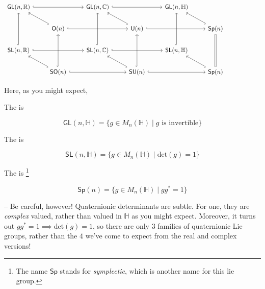 \documentclass[../main.tex]{subfiles}
\begin{document}
\[\begin{tikzcd}
	&&&&& {} \\
	{\mathsf{GL}(n,\mathbb{R})} && {\mathsf{GL}(n,\mathbb{C})} && {\mathsf{GL}(n,\mathbb{H})} \\
	& {\mathsf{O}(n)} && {\mathsf{U}(n)} && {\mathsf{Sp}(n)} && {} \\
	{\mathsf{SL}(n,\mathbb{R})} && {\mathsf{SL}(n,\mathbb{C})} && {\mathsf{SL}(n,\mathbb{H})} \\
	& {\mathsf{SO}(n)} && {\mathsf{SU}(n)} && {\mathsf{Sp}(n)}
	\arrow[hook, from=4-1, to=2-1]
	\arrow[hook, from=3-2, to=2-1]
	\arrow[hook, from=5-2, to=4-1]
	\arrow[hook, from=5-2, to=3-2]
	\arrow[hook, from=4-3, to=2-3]
	\arrow[hook, from=3-4, to=2-3]
	\arrow[hook, from=5-4, to=3-4]
	\arrow[hook, from=5-4, to=4-3]
	\arrow[hook, from=5-2, to=5-4]
	\arrow[hook, from=4-1, to=4-3]
	\arrow[hook, from=3-2, to=3-4]
	\arrow[hook, from=2-1, to=2-3]
	\arrow[hook, from=5-4, to=5-6]
	\arrow[hook, from=4-3, to=4-5]
	\arrow[hook, from=2-3, to=2-5]
	\arrow[hook, from=4-5, to=2-5]
	\arrow[hook, from=5-6, to=4-5]
	\arrow[Rightarrow, no head, from=5-6, to=3-6]
	\arrow[hook, from=3-6, to=2-5]
	\arrow[hook, from=3-4, to=3-6]
\end{tikzcd}\]

Here, as you might expect,

\begin{defn}
  The  is

  \[ \mathsf{GL}(n, \mathbb{H}) = \{ g \in M_n(\mathbb{H}) \mid g \text{ is invertible} \} \]
\end{defn}

\begin{defn}
  The  is

  \[ \mathsf{SL}(n, \mathbb{H}) = \{ g \in M_n(\mathbb{H}) \mid \text{det}(g) = 1 \} \]
\end{defn}

\begin{defn}
  The  is%
  \footnote{The name $\mathsf{Sp}$ stands for \emph{symplectic}, 
  which is another name for this lie group.}

  \[ \mathsf{Sp}(n) = \{ g \in M_n(\mathbb{H}) \mid g g^* = 1 \} \]
\end{defn}

\warning -- Be careful, however! Quaternionic determinants are subtle.
For one, they are \emph{complex} valued, rather than valued in $\mathbb{H}$ 
as you might expect. Moreover, it turns out $g g^* = 1 \implies \text{det}(g) = 1$,
so there are only $3$ families of quaternionic Lie groups, rather than the $4$
we've come to expect from the real and complex versions!

\end{document}
